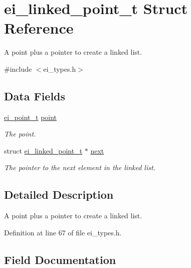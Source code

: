 \hypertarget{structei__linked__point__t}{}\section{ei\+\_\+linked\+\_\+point\+\_\+t Struct Reference}
\label{structei__linked__point__t}


A point plus a pointer to create a linked list.  




{\ttfamily \#include $<$ei\+\_\+types.\+h$>$}

\subsection*{Data Fields}
\begin{DoxyCompactItemize}
\item 
\hyperlink{structei__point__t}{ei\+\_\+point\+\_\+t} \hyperlink{structei__linked__point__t_a5774a3902514ef5c0f599829894c56a6}{point}
\begin{DoxyCompactList}\small\item\em The point. \end{DoxyCompactList}\item 
struct \hyperlink{structei__linked__point__t}{ei\+\_\+linked\+\_\+point\+\_\+t} $\ast$ \hyperlink{structei__linked__point__t_aa629ae723d95d2b5538d95306579443c}{next}
\begin{DoxyCompactList}\small\item\em The pointer to the next element in the linked list. \end{DoxyCompactList}\end{DoxyCompactItemize}


\subsection{Detailed Description}
A point plus a pointer to create a linked list. 

Definition at line 67 of file ei\+\_\+types.\+h.



\subsection{Field Documentation}
\mbox{\label{structei__linked__point__t_aa629ae723d95d2b5538d95306579443c}} 
